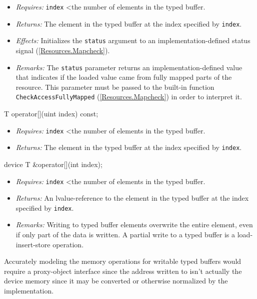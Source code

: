\begin{itemize}
  \item \textit{Requires:} \texttt{index} \textless\enspace the number of
  elements in the typed buffer.
  \item \textit{Returns:} The element in the typed buffer at the index specified
  by \texttt{index}.
  \item \textit{Effects:} Initializes the \texttt{status} argument to an
  implementation-defined status signal (\ref{Resources.Mapcheck}).
  \item \textit{Remarks:} The \texttt{status} parameter returns an
  implementation-defined value that indicates if the loaded value came from
  fully mapped parts of the resource. This parameter must be passed to the
  built-in function \texttt{CheckAccessFullyMapped} (\ref{Resources.Mapcheck})
  in order to interpret it.
\end{itemize}


\begin{HLSL}
T operator[](uint index) const;
\end{HLSL}

\begin{itemize}
  \item \textit{Requires:} \texttt{index} \textless\enspace the number of
  elements in the typed buffer.
  \item \textit{Returns:} The element in the typed buffer at the index specified
  by \texttt{index}.
\end{itemize}

\begin{HLSL}
device T &operator[](int index);
\end{HLSL}

\begin{itemize}
  \item \textit{Requires:} \texttt{index} \textless\enspace the number of
  elements in the typed buffer.
  \item \textit{Returns:} An lvalue-reference to the element in the typed buffer
  at the index specified by \texttt{index}.
  \item \textit{Remarks:} Writing to typed buffer elements overwrite the entire
  element, even if only part of the data is written. A partial write to a typed
  buffer is a load-insert-store operation.
\end{itemize}

\begin{note}
  Accurately modeling the memory operations for writable typed buffers would
  require a proxy-object interface since the address written to isn't actually
  the device memory since it may be converted or otherwise normalized by the
  implementation.
\end{note}

